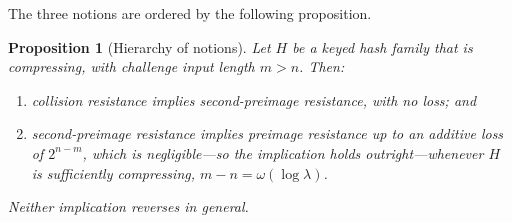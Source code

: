 \documentclass[11pt,a4paper]{article}
\newtheorem{proposition}[theorem]{Proposition}
\theoremstyle{definition}
\theoremstyle{remark}
\begin{document}
The three notions are ordered by the following proposition.

\begin{proposition}[Hierarchy of notions]\label{hash:prop:hierarchy}
Let \(H\) be a keyed hash family that is compressing, with challenge
input length \(m > n\). Then:
\begin{enumerate}
\item collision resistance implies second-preimage resistance, with no
  loss; and
\item second-preimage resistance implies preimage resistance up to an
  additive loss of \(2^{n-m}\), which is negligible---so the
  implication holds outright---whenever \(H\) is sufficiently
  compressing, \(m - n = \omega(\log \lambda)\).
\end{enumerate}
Neither implication reverses in general.
\end{proposition}
\end{document}
